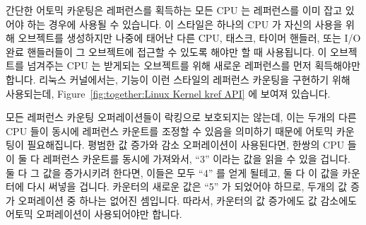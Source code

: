 간단한 어토믹 카운팅은 레퍼런스를 획득하는 모든 CPU 는 레퍼런스를 이미 잡고
있어야 하는 경우에 사용될 수 있습니다.
이 스타일은 하나의 CPU 가 자신의 사용을 위해 오브젝트를 생성하지만 나중에
태어난 다른 CPU, 태스크, 타이머 핸들러, 또는 I/O 완료 핸들러들이 그 오브젝트에
접근할 수 있도록 해야만 할 때 사용됩니다.
이 오브젝트를 넘겨주는 CPU 는 받게되는 오브젝트를 위해 새로운 레퍼런스를 먼저
획득해야만 합니다.
리눅스 커널에서는,  기능이 이런 스타일의 레퍼런스 카운팅을 구현하기
위해 사용되는데,
Figure~\ref{fig:together:Linux Kernel kref API} 에 보여져 있습니다.
\iffalse

Simple atomic counting may be used in cases where any CPU acquiring
a reference must already hold a reference.
This style is used when a single CPU creates an object for its
own private use, but must allow other CPU, tasks, timer handlers,
or I/O completion handlers that it later spawns to also access this object.
Any CPU that hands the object off must first acquire a new reference
on behalf of the recipient object.
In the Linux kernel, the \co{kref} primitives are used to implement
this style of reference counting, as shown in
Listing~\ref{lst:together:Linux Kernel kref API}.
\fi

모든 레퍼런스 카운팅 오퍼레이션들이 락킹으로 보호되지는 않는데, 이는 두개의
다른 CPU 들이 동시에 레퍼런스 카운트를 조정할 수 있음을 의미하기 때문에 어토믹
카운팅이 필요해집니다.
평범한 값 증가와 감소 오퍼레이션이 사용된다면, 한쌍의 CPU 들이 둘 다 레퍼런스
카운트를 동시에 가져와서, ``3'' 이라는 값을 읽을 수 있을 겁니다.
둘 다 그 값을 증가시키려 한다면, 이들은 모두 ``4'' 를 얻게 될테고, 둘 다 이
값을 카운터에 다시 써넣을 겁니다.
카운터의 새로운 값은 ``5'' 가 되었어야 하므로, 두개의 값 증가 오퍼레이션 중
하나는 없어진 셈입니다.
따라서, 카운터의 값 증가에도 값 감소에도 어토믹 오퍼레이션이 사용되어야만
합니다.
\iffalse

Atomic counting is required
because locking is not used to protect all reference-count operations,
which means that it is possible for two different CPUs to concurrently
manipulate the reference count.
If normal increment and decrement were used, a pair of CPUs might both
fetch the reference count concurrently, perhaps both obtaining
the value ``3''.
If both of them increment their value, they will both obtain ``4'',
and both will store this value back into the counter.
Since the new value of the counter should instead be ``5'', one
of the two increments has been lost.
Therefore, atomic operations must be used both for counter increments
and for counter decrements.
\fi

